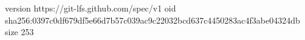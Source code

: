 version https://git-lfs.github.com/spec/v1
oid sha256:0397c0df679df5e66d7b57c039ac9c22032bcd637c4450283ac4f3abe04324db
size 253
